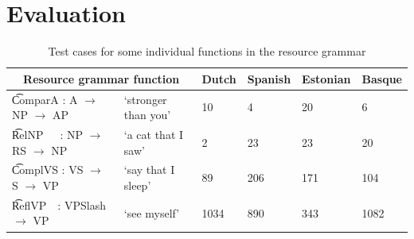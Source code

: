 % 



\section{Evaluation}
\label{sec:evalGF}

\begin{table}[h]
\centering
{}
\caption{Test cases for all functions in three grammars}
\label{results}
\end{table}


\begin{table}[h]

\centering
\begin{tabular}{|ll|l|l|l|l|}
\hline
\multicolumn{2}{|c|}{\bf Resource grammar function} & {\bf Dutch} & {\bf Spanish}
   & {\bf Estonian} & {\bf Basque} \\ \hline
 
\t{ComparA : A  $\rightarrow$ NP $\rightarrow$ AP~} & `stronger than you' & 10   & 4   & 20 & 6   \\
\t{RelNP~~~: NP $\rightarrow$ RS $\rightarrow$ NP~} & `a cat that I saw'  & 2    & 23 & 23 & 20   \\
\t{ComplVS : VS $\rightarrow$ S  $\rightarrow$ VP~} &`say that I sleep'  & 89   & 206 & 171 & 104 \\
\t{ReflVP~~: VPSlash $\rightarrow$ VP~~} & `see myself'        & 1034 & 890 & 343 & 1082 \\
\hline
\end{tabular}
\caption{Test cases for some individual functions in the resource
  grammar}
\label{results_indiv}
\end{table}


